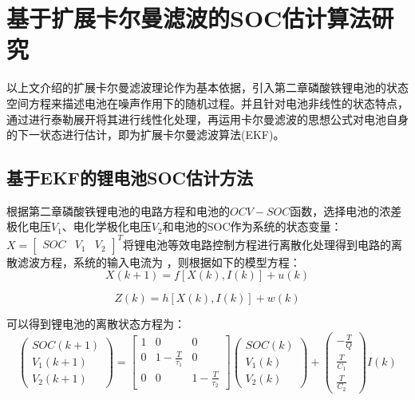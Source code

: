 \section{基于扩展卡尔曼滤波的SOC估计算法研究}
以上文介绍的扩展卡尔曼滤波理论作为基本依据，引入第二章磷酸铁锂电池的状态空间方程来描述电池在噪声作用下的随机过程。并且针对电池非线性的状态特点，通过进行泰勒展开将其进行线性化处理，再运用卡尔曼滤波的思想公式对电池自身的下一状态进行估计，即为扩展卡尔曼滤波算法(EKF)。
\subsection{基于EKF的锂电池SOC估计方法}
根据第二章磷酸铁锂电池的电路方程和电池的$OCV - SOC$函数，选择电池的浓差极化电压${V_1}$、电化学极化电压${V_2}$和电池的SOC作为系统的状态变量：$X = {\left[ {\begin{array}{*{20}{c}}
{SOC}&{{V_1}}&{{V_2}}
\end{array}} \right]^T}$将锂电池等效电路控制方程进行离散化处理得到电路的离散滤波方程，系统的输入电流为 ，则根据如下的模型方程：
\begin{equation}
X\left( {k + 1} \right) = f\left[ {X\left( k \right),I\left( k \right)} \right] + u\left( k \right)
\end{equation} 

\begin{equation}
Z\left( k \right) = h\left[ {X\left( k \right),I\left( k \right)} \right] + w\left( k \right)
\end{equation} 

可以得到锂电池的离散状态方程为：
\begin{equation}
\left( {\begin{array}{*{20}{c}}
{SOC\left( {k + 1} \right)}\\
{{V_1}\left( {k + 1} \right)}\\
{{V_2}\left( {k + 1} \right)}
\end{array}} \right) = \left[ {\begin{array}{*{20}{c}}
1&0&0\\
0&{1 - \frac{T}{{{\tau _1}}}}&0\\
0&0&{1 - \frac{T}{{{\tau _2}}}}
\end{array}} \right]\left( {\begin{array}{*{20}{c}}
{SOC\left( k \right)}\\
{{V_1}\left( k \right)}\\
{{V_2}\left( k \right)}
\end{array}} \right) + \left( {\begin{array}{*{20}{c}}
{ - \frac{T}{Q}}\\
{\frac{T}{{{C_1}}}}\\
{\frac{T}{{{C_2}}}}
\end{array}} \right)I\left( k \right)
\end{equation} 

